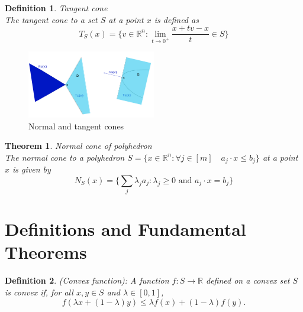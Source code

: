 \documentclass[11pt]{book} %
\newtheorem{theorem}{Theorem}[section]
\newtheorem{definition}{Definition}[section]
\begin{document}
\begin{definition}{Tangent cone} \\
The tangent cone to a set $S$ at a point $x$ is defined as
\begin{equation}
    T_S(x) = \{ v \in \mathbb{R}^n : \lim_{t \rightarrow 0^+} \frac{x + tv - x}{t} \in S \}
\end{equation}
\end{definition}

\begin{figure}[H]
    \centering
    \includegraphics[width=0.5\textwidth]{Figs/normal-cones.png}
    \caption{Normal and tangent cones}
\end{figure}

\begin{theorem}{Normal cone of polyhedron} \\
The normal cone to a polyhedron $S = \{x \in \mathbb{R}^n : \forall j \in [m] \quad a_j \cdot x \leq b_j\}$ at a point $x$ is given by
\begin{equation}
    N_S(x) = \{ \sum_{j} \lambda_j a_j : \lambda_j \geq 0  \text{ and }  a_j \cdot x = b_j \}
\end{equation}
    
\end{theorem}




\section{Definitions and Fundamental Theorems}



\begin{definition} (Convex function): A function $f : S \rightarrow \mathbb{R}$ defined on a convex set $S$ is convex if, for all $x, y \in S$ and $\lambda \in [0,1]$, 
\[ f(\lambda x + (1-\lambda)y) \leq \lambda f(x) + (1-\lambda) f(y). \]
\end{definition}
\end{document}
